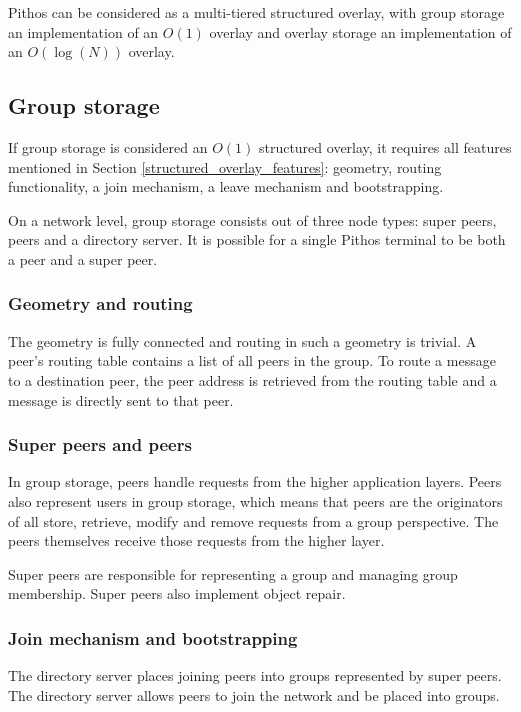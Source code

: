 Pithos can be considered as a multi-tiered structured overlay, with group storage an implementation of an $O(1)$ overlay and overlay storage an implementation of an $O(\log (N))$ overlay.

\subsection{Group storage}

If group storage is considered an $O(1)$ structured overlay, it requires all features mentioned in Section \ref{structured_overlay_features}: geometry, routing functionality, a join mechanism, a leave mechanism and bootstrapping.

On a network level, group storage consists out of three node types: super peers, peers and a directory server. It is possible for a single Pithos terminal to be both a peer and a super peer.

\subsubsection{Geometry and routing}

The geometry is fully connected and routing in such a geometry is trivial. A peer's routing table contains a list of all peers in the group. To route a message to a destination peer, the peer address is retrieved from the routing table and a message is directly sent to that peer.

\subsubsection{Super peers and peers}

In group storage, peers handle requests from the higher application layers. Peers also represent users in group storage, which means that peers are the originators of all store, retrieve, modify and remove requests from a group perspective. The peers themselves receive those requests from the higher layer.

Super peers are responsible for representing a group and managing group membership. Super peers also implement object repair.

\subsubsection{Join mechanism and bootstrapping}
\label{join_mechanism}

The directory server places joining peers into groups represented by super peers. The directory server allows peers to join the network and be placed into groups.

